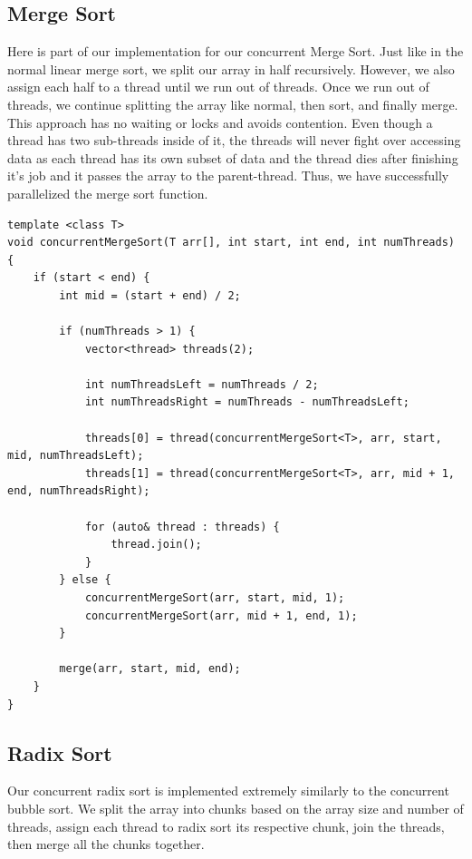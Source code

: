 \documentclass[conference]{IEEEtran}
\begin{document}
\subsection{Merge Sort}
Here is part of our implementation for our concurrent Merge Sort. Just like in the normal linear merge sort, we split our array in half recursively. However, we also assign each half to a thread until we run out of threads. Once we run out of threads, we continue splitting the array like normal, then sort, and finally merge. This approach has no waiting or locks and avoids contention. Even though a thread has two sub-threads inside of it, the threads will never fight over accessing data as each thread has its own subset of data and the thread dies after finishing it's job and it passes the array to the parent-thread. Thus, we have successfully parallelized the merge sort function.

\begin{lstlisting}
template <class T>
void concurrentMergeSort(T arr[], int start, int end, int numThreads) {
    if (start < end) {
        int mid = (start + end) / 2;
        
        if (numThreads > 1) {
            vector<thread> threads(2);

            int numThreadsLeft = numThreads / 2;
            int numThreadsRight = numThreads - numThreadsLeft;

            threads[0] = thread(concurrentMergeSort<T>, arr, start, mid, numThreadsLeft);
            threads[1] = thread(concurrentMergeSort<T>, arr, mid + 1, end, numThreadsRight);
            
            for (auto& thread : threads) {
                thread.join();
            }
        } else {
            concurrentMergeSort(arr, start, mid, 1);
            concurrentMergeSort(arr, mid + 1, end, 1);
        }

        merge(arr, start, mid, end);
    }
}
\end{lstlisting}

\subsection{Radix Sort}
Our concurrent radix sort is implemented extremely similarly to the concurrent bubble sort. We split the array into chunks based on the array size and number of threads, assign each thread to radix sort its respective chunk, join the threads, then merge all the chunks together.
\end{document}
